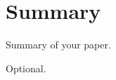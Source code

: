 \documentclass[journal]{IEEEtran}
\begin{document}
\blindtext
\blindtext

\section{Summary}
Summary of your paper.

\blindtext

\appendix
Optional.

\blindtext



\printbibliography

\end{document}
